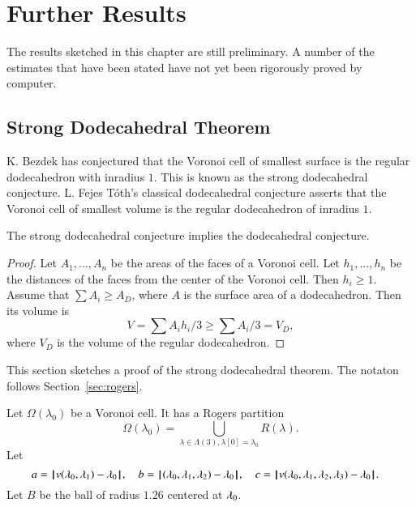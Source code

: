 
\chapter{Further Results}

\begin{note}%
The results sketched in this chapter are still preliminary.  A number of the estimates that have been stated have not yet been rigorously proved by computer. 
\end{note}

\section{Strong Dodecahedral Theorem}

K. Bezdek has conjectured that the Voronoi cell of smallest surface is the regular dodecahedron with inradius $1$.  This is known as the strong dodecahedral conjecture.  L. Fejes T\'oth's classical dodecahedral conjecture asserts that the Voronoi cell of smallest volume is the regular dodecahedron of inradius $1$.

\begin{lemma}  The strong dodecahedral conjecture implies the dodecahedral conjecture.
\end{lemma}

\begin{proof}  Let $A_1,\ldots,A_n$ be the areas of the faces of a Voronoi cell.  Let $h_1,\ldots,h_n$ be the distances of the faces from the center of the Voronoi cell.  Then $h_i\ge 1$.  Assume that $\sum A_i \ge A_D$, where $A$ is the surface area of a dodecahedron.  Then its volume is
$$
V = \sum A_i h_i/3 \ge \sum A_i/3 = V_D,
$$
where $V_D$ is the volume of the regular dodecahedron.
\end{proof}

This section sketches a proof of the strong dodecahedral theorem.  The notaton follows Section~\ref{sec:rogers}.

Let $\Omega(\lambda_0)$ be a Voronoi cell.    It has a Rogers partition
$$
\Omega(\lambda_0) = \bigcup_{\lambda\in \Lambda(3),\lambda[0]=\lambda_0 } R(\lambda).
$$
Let 
$$
a = {\hskip0.1em|\hskip-0.15em|\hskip0.1em} v(\lambda_0,\lambda_1) -   \lambda_0{\hskip0.1em|\hskip-0.15em|\hskip0.1em},\quad
b = {\hskip0.1em|\hskip-0.15em|\hskip0.1em}(\lambda_0,\lambda_1,\lambda_2) -  \lambda_0{\hskip0.1em|\hskip-0.15em|\hskip0.1em},\quad
c = {\hskip0.1em|\hskip-0.15em|\hskip0.1em} v(\lambda_0,\lambda_1,\lambda_2,\lambda_3) -   \lambda_0{\hskip0.1em|\hskip-0.15em|\hskip0.1em}.\quad
$$
Let $B$ be the ball of radius $1.26$ centered at $\lambda_0$.


